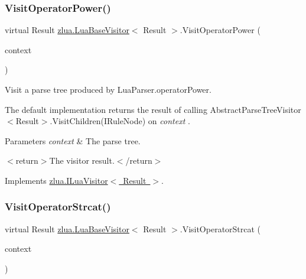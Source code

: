 \subsubsection{\texorpdfstring{Visit\+Operator\+Power()}{VisitOperatorPower()}}
{\footnotesize\ttfamily virtual Result \mbox{\hyperlink{classzlua_1_1_lua_base_visitor}{zlua.\+Lua\+Base\+Visitor}}$<$ Result $>$.Visit\+Operator\+Power (\begin{DoxyParamCaption}\item[{\mbox{[}\+Not\+Null\mbox{]} \mbox{\hyperlink{classzlua_1_1_lua_parser_1_1_operator_power_context}{Lua\+Parser.\+Operator\+Power\+Context}}}]{context }\end{DoxyParamCaption})\hspace{0.3cm}{\ttfamily [virtual]}}



Visit a parse tree produced by Lua\+Parser.\+operator\+Power. 

The default implementation returns the result of calling Abstract\+Parse\+Tree\+Visitor$<$\+Result$>$.\+Visit\+Children(\+I\+Rule\+Node) on {\itshape context} . 


\begin{DoxyParams}{Parameters}
{\em context} & The parse tree.\\
\hline
\end{DoxyParams}
$<$return$>$The visitor result.$<$/return$>$ 

Implements \mbox{\hyperlink{interfacezlua_1_1_i_lua_visitor_aca792a2823d12a1cb5a7dc7cf86550b4}{zlua.\+I\+Lua\+Visitor$<$ Result $>$}}.

\mbox{\label{classzlua_1_1_lua_base_visitor_a1a5bcdac1187b46cbb8d731919052d09}} 
\subsubsection{\texorpdfstring{Visit\+Operator\+Strcat()}{VisitOperatorStrcat()}}
{\footnotesize\ttfamily virtual Result \mbox{\hyperlink{classzlua_1_1_lua_base_visitor}{zlua.\+Lua\+Base\+Visitor}}$<$ Result $>$.Visit\+Operator\+Strcat (\begin{DoxyParamCaption}\item[{\mbox{[}\+Not\+Null\mbox{]} \mbox{\hyperlink{classzlua_1_1_lua_parser_1_1_operator_strcat_context}{Lua\+Parser.\+Operator\+Strcat\+Context}}}]{context }\end{DoxyParamCaption})\hspace{0.3cm}{\ttfamily [virtual]}}




